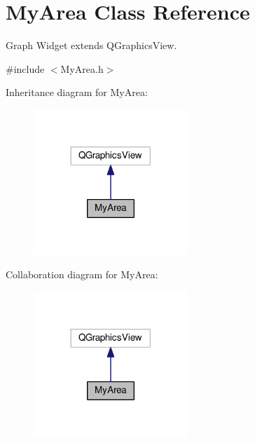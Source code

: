 \hypertarget{classMyArea}{\section{My\+Area Class Reference}
\label{classMyArea}
}


Graph Widget extends Q\+Graphics\+View.  




{\ttfamily \#include $<$My\+Area.\+h$>$}



Inheritance diagram for My\+Area\+:\nopagebreak
\begin{figure}[H]
\begin{center}
\leavevmode
\includegraphics[width=165pt]{classMyArea__inherit__graph}
\end{center}
\end{figure}


Collaboration diagram for My\+Area\+:\nopagebreak
\begin{figure}[H]
\begin{center}
\leavevmode
\includegraphics[width=165pt]{classMyArea__coll__graph}
\end{center}
\end{figure}
